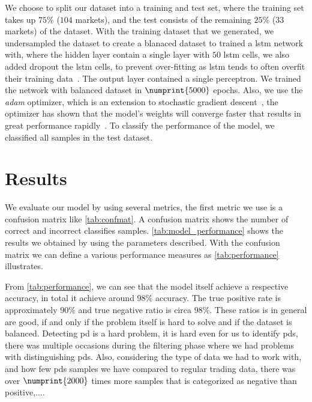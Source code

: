 We choose to split our dataset into a training and test set, where the training set takes up $75\%$ ($104$ markets), and the test consists of the remaining $25\%$ ($33$ markets) of the dataset.  With the training dataset that we generated, we undersampled the dataset to create a blanaced dataset to trained a \ac{lstm} network with, where the hidden layer contain a single layer with $50$ \ac{lstm} cells, we also added dropout the \ac{lstm} cells, to prevent over-fitting as \ac{lstm} tends to often overfit their training data~\cite{overfit}. The output layer contained a single perceptron. We trained the network with balanced dataset in  $\numprint{5000}$ epochs. Also, we use the \emph{adam} optimizer, which is an extension to stochastic gradient descent~\cite{kingma2014adam}, the optimizer has shown that the model's weights will converge faster that results in great performance rapidly~\cite{adam}. To classify the performance of the model, we classified all samples in the test dataset.

\section{Results}
We evaluate our model by using several metrics, the first metric we use is a confusion matrix like \autoref{tab:confmat}. A confusion matrix shows the number of correct and incorrect classifies samples. \autoref{tab:model_performance} shows the results we obtained by using the parameters described. With the confusion matrix we can define a various performance measures as \autoref{tab:performance} illustrates.





From \autoref{tab:performance}, we can see that the model itself achieve a respective accuracy, in total it achieve around $98\%$ accuracy. The true positive rate is approximately $90\%$ and true negative ratio is circa $98\%$. These ratios is in general are good, if and only if the problem itself is hard to solve and if the dataset is balanced. Detecting \ac{pd} is a hard problem, it is hard even for us to identify \acp{pd}, there was multiple occasions during the filtering phase where we had problems with distinguishing \acp{pd}. Also, considering the type of data we had to work with, and how few \acp{pd} samples we have compared to regular trading data, there was over $\numprint{2000}$ times more samples that is categorized as negative than positive,....

